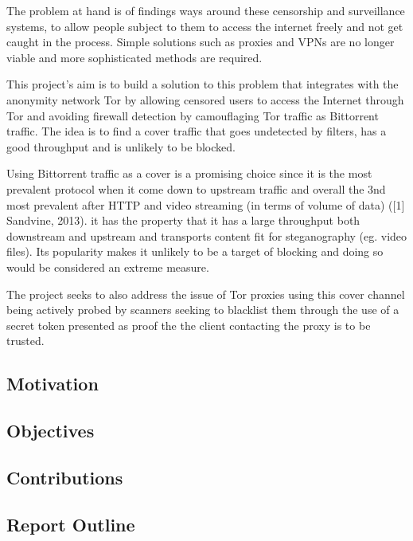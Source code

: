\documentclass[11pt]{article} %
\begin{document}
The problem at hand is of findings ways around these censorship and surveillance systems, to allow people subject to them to access the internet freely and not get caught in the process. Simple solutions such as proxies and VPNs are no longer viable and more sophisticated methods are required. 

This project’s aim is to build a solution to this problem that integrates with the anonymity network Tor by allowing censored users to access the Internet through Tor and avoiding firewall detection by camouflaging Tor traffic as Bittorrent traffic. The idea is to find a cover traffic that goes undetected by filters, has a good throughput and is unlikely to be blocked.

Using Bittorrent traffic as a cover is a promising choice since it is the most prevalent protocol when it come down to upstream traffic and overall the 3nd most prevalent after HTTP and video streaming (in terms of volume of data) ([1] Sandvine, 2013). it has the property that it has a large throughput both downstream and upstream and transports content fit for steganography (eg. video files). Its popularity makes it unlikely to be a target of blocking and doing so would be considered an extreme measure.

The project seeks to also address the issue of Tor proxies using this cover channel being actively probed by scanners seeking to blacklist them through the use of a secret token presented as proof the the client contacting the proxy is to be trusted.


\subsection{Motivation}

\subsection{Objectives}


\subsection{Contributions}



\subsection{Report Outline}
%

\newpage
\end{document}
